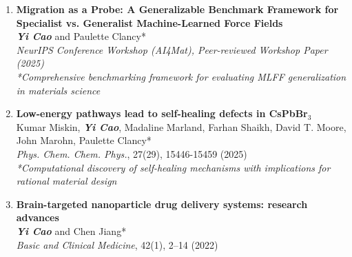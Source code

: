 \documentclass[10pt, letterpaper]{article}
\let\hrefWithoutArrow\href
\renewcommand{\href}[2]{\hrefWithoutArrow{#1}{\mbox{\ifthenelse{\equal{#2}{}}{ }{#2 }\raisebox{.15ex}{\footnotesize \faExternalLink*}}}}
\begin{document}
\begin{enumerate}
    \textit{Submitted to KDD Conference, AI4Sciences Track (2026)} 
    \quad 
    \href{https://github.com/yicao-elina/LLM4Chem-Explainable-synthesis.git}{\faGithub \ } 
    \item \textbf{Migration as a Probe: A Generalizable Benchmark Framework for Specialist vs. Generalist Machine-Learned Force Fields} \\
    \textbf{\textit{Yi Cao}} and Paulette Clancy* \\
    \textit{NeurIPS Conference Workshop (AI4Mat), Peer-reviewed Workshop Paper (2025)}
    \quad \href{https://openreview.net/forum?id=RnITjvwxke}{\faBook\ }
    \quad \href{https://github.com/yicao-elina/MigrationBench}{\faGithub\ }
    \quad \href{https://www.linkedin.com/posts/yi-cao-1368ab292_neurips2025-ai4science-ai4mat-activity-7403636953461719040-FNeY?utm_source=share&utm_medium=member_desktop&rcm=ACoAAEb3tPoBgmt_8xQYwQpEY2DbQllFRcSwlU4}{\faGlobe}
    \\
    \textit{*Comprehensive benchmarking framework for evaluating MLFF generalization in materials science}

    \item \textbf{Low-energy pathways lead to self-healing defects in CsPbBr$_3$} \\
    Kumar Miskin, \textbf{\textit{Yi Cao}}, Madaline Marland, Farhan Shaikh, David T. Moore, John Marohn, Paulette Clancy* \\
    \textit{Phys. Chem. Chem. Phys.}, 27(29), 15446-15459 (2025)  
    \quad \href{https://doi.org/10.1039/D5CP01641J}{\faBook\ } 
    \quad \href{https://github.com/pclancy-lab/perovskites_space.git}{\faGithub} \\
    \textit{*Computational discovery of self-healing mechanisms with implications for rational material design}

    \item \textbf{Brain-targeted nanoparticle drug delivery systems: research advances} \\
    \textbf{\textit{Yi Cao}} and Chen Jiang* \\
    \textit{Basic and Clinical Medicine}, 42(1), 2–14 (2022)  
    \quad \href{https://scholar.google.com/citations?view_op=view_citation&hl=en&user=t_gDF-EAAAAJ&citation_for_view=t_gDF-EAAAAJ:d1gkVwhDpl0C}{\faBook } \\
\end{enumerate}
    
\end{document}
